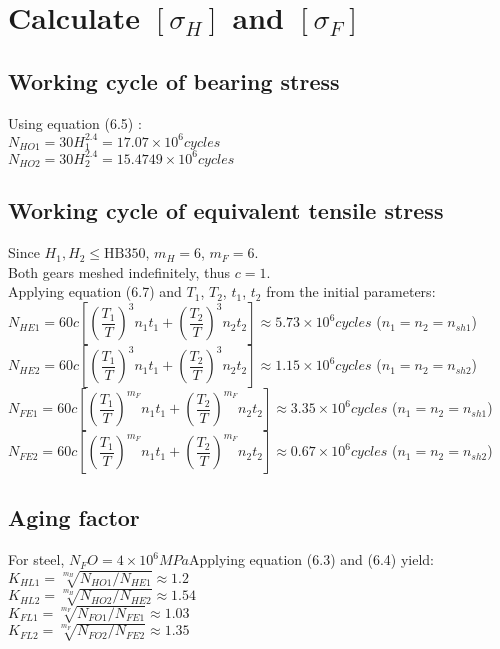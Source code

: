 \section{Calculate $ [\sigma_H] $ and $ [\sigma_F] $}
\subsection{Working cycle of bearing stress}
Using equation (6.5) :\\
$ N_{HO1} = 30H_1^{2.4} = 17.07\times10^6\unit{cycles}$\\
$ N_{HO2} = 30H_2^{2.4} = 15.4749\times10^6\unit{cycles}$
\subsection{Working cycle of equivalent tensile stress}
Since $ H_1,H_2\leq\text{HB}350 $, $ m_H=6 $, $ m_F=6 $.\\
Both gears meshed indefinitely, thus $ c=1 $.\\ Applying equation (6.7)  and $ T_1 $, $ T_2 $, $ t_1 $, $ t_2 $ from the initial parameters:\\
$ N_{HE1} = 60c\left[ \left( \dfrac{T_1}{T}\right)^3n_1t_1 + \left( \dfrac{T_2}{T}\right)^3n_2t_2\right] \approx 5.73\times10^6\unit{cycles}$ ($ n_1=n_2=n_{sh1} $)\\
$ N_{HE2} = 60c\left[ \left( \dfrac{T_1}{T}\right)^3n_1t_1 + \left( \dfrac{T_2}{T}\right)^3n_2t_2\right] \approx 1.15\times10^6\unit{cycles}$ ($ n_1=n_2=n_{sh2} $)\\
$ N_{FE1} = 60c\left[ \left( \dfrac{T_1}{T}\right)^{m_F}n_1t_1 + \left( \dfrac{T_2}{T}\right)^{m_F}n_2t_2\right] \approx 3.35\times10^6\unit{cycles}$ ($ n_1=n_2=n_{sh1} $)\\
$ N_{FE2} = 60c\left[ \left( \dfrac{T_1}{T}\right)^{m_F}n_1t_1 + \left( \dfrac{T_2}{T}\right)^{m_F}n_2t_2\right] \approx 0.67\times10^6\unit{cycles}$ ($ n_1=n_2=n_{sh2} $)\\
\subsection{Aging factor}
For steel, $ N_FO = 4\times10^6\unit{MPa}$Applying equation (6.3) and (6.4)  yield:\\
$K_{HL1} = \sqrt[m_H]{N_{HO1}/N_{HE1}} \approx 1.2$\\
$ K_{HL2} = \sqrt[m_H]{N_{HO2}/N_{HE2}} \approx 1.54$\\
$ K_{FL1} = \sqrt[m_F]{N_{FO1}/N_{FE1}} \approx 1.03$\\
$ K_{FL2} = \sqrt[m_F]{N_{FO2}/N_{FE2}} \approx 1.35$
